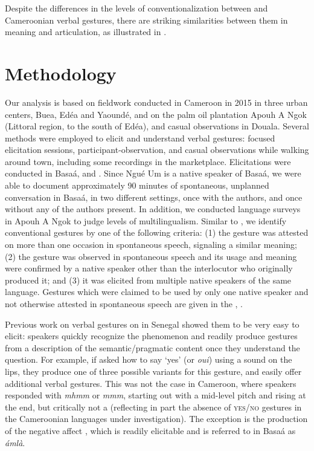 \documentclass[output=paper
,newtxmath
,modfonts
,nonflat]{langsci/langscibook}
\begin{document}
Despite the differences in the levels of conventionalization between  and Cameroonian verbal gestures, there are striking similarities between them in meaning and articulation, as illustrated in . 


\section{Methodology}

Our analysis is based on fieldwork conducted in Cameroon in 2015 in three urban centers, Buea, Ed\'{e}a and Yaound\'{e}, and on the palm oil plantation Apouh A Ngok (Littoral region, to the south of Ed\'{e}a), and casual observations in Douala.  Several methods were employed to elicit and understand verbal gestures: focused elicitation sessions, participant-observation, and casual observations while walking around town, including some recordings in the marketplace. Elicitations were conducted in Basa\'{a},  and . Since Ngu\'{e} Um is a native speaker of Basa\'{a}, we were able to document approximately 90 minutes of spontaneous, unplanned conversation in Basa\'{a},   in two different settings, once with the authors, and once without any of the authors present. In addition, we conducted language surveys in Apouh A Ngok to judge levels of multilingualism. Similar to \citet[191]{brookes2004}, we identify conventional gestures by one of the following criteria: (1) the gesture was attested on more than one occasion in spontaneous speech, signaling a similar meaning; (2) the gesture was observed in spontaneous speech and its usage and meaning were confirmed by a native speaker other than the interlocutor who originally produced it; and (3) it was elicited from multiple native speakers of the same language. Gestures which were claimed to be used by only one native speaker and not otherwise attested in spontaneous speech are given in the  , .

Previous work on verbal gestures on  in Senegal showed them to be very easy to elicit:  speakers quickly recognize the phenomenon and readily produce gestures from a description of the semantic/pragmatic content once they understand the question. For example, if asked how to say `yes' (or \textit{oui}) using a sound on the lips, they produce one of three possible  variants for this gesture, and easily offer additional verbal gestures. This was not the case in Cameroon, where speakers responded with \textit{mhmm} or \textit{mmm}, starting out with a mid-level pitch and rising at the end, but critically not a  (reflecting in part the absence of \textsc {yes/no} gestures in the Cameroonian languages under investigation).  The exception is the production of the negative affect , which is readily elicitable and is referred to in Basa\'{a} as \textit{\tS\'{a}ml\`{a}}.
\end{document}

